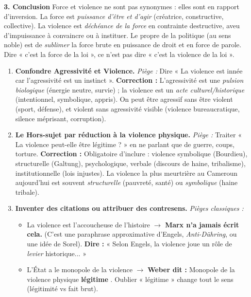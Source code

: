 \documentclass[11pt]{article}
\newcommand{\cle}[1]{{\popxbold\color{popdark}#1}}
\begin{document}
\begin{exoresolu}
\textbf{3. Conclusion}
Force et violence ne sont pas synonymes : elles sont en \cle{rapport d'inversion}. La force est \emph{puissance d'être et d'agir} (créatrice, constructive, collective). La violence est \emph{déchéance de la force} en contrainte destructive, aveu d'impuissance à convaincre ou à instituer. Le propre de la \cle{politique} (au sens noble) est de \emph{sublimer} la force brute en \cle{puissance de droit} et en \cle{force de parole}. Dire « c'est la force de la loi », ce n'est pas dire « c'est la violence de la loi ».
\end{exoresolu}

\begin{attention}
\begin{enumerate}
    \item \textbf{Confondre \cle{Agressivité} et \cle{Violence}.} \textit{Piège :} Dire « La violence est innée car l'agressivité est un instinct ». \textbf{Correction :} L'agressivité est une \emph{pulsion biologique} (énergie neutre, survie) ; la violence est un \emph{acte culturel/historique} (intentionnel, symbolique, appris). On peut être agressif sans être violent (sport, défense), et violent sans agressivité visible (violence bureaucratique, silence méprisant, corruption).
    \item \textbf{Le \cle{Hors-sujet} par réduction à la violence physique.} \textit{Piège :} Traiter « La violence peut-elle être légitime ? » en ne parlant que de guerre, coups, torture. \textbf{Correction :} Obligatoire d'inclure : violence symbolique (Bourdieu), structurelle (Galtung), psychologique, verbale (discours de haine, tribalisme), institutionnelle (lois injustes). La violence la plus meurtrière au Cameroun aujourd'hui est souvent \emph{structurelle} (pauvreté, santé) ou \emph{symbolique} (haine tribale).
    \item \textbf{Inventer des citations ou attribuer des contresens.} \textit{Pièges classiques :}
        \begin{itemize}
            \item \guillemotleft La violence est l'accoucheuse de l'histoire \guillemotright $\rightarrow$ \textbf{Marx n'a jamais écrit cela.} (C'est une paraphrase approximative d'Engels, \emph{Anti-Dühring}, ou une idée de Sorel). \textbf{Dire :} « Selon Engels, la violence joue un rôle de \emph{levier} historique... »
            \item \guillemotleft L'État a le monopole de la violence \guillemotright $\rightarrow$ \textbf{Weber dit :} \guillemotleft Monopole de la violence physique \textbf{légitime} \guillemotright. Oublier « légitime » change tout le sens (légitimité vs fait brut).

\end{itemize}
\end{enumerate}
\end{attention}
\end{document}
